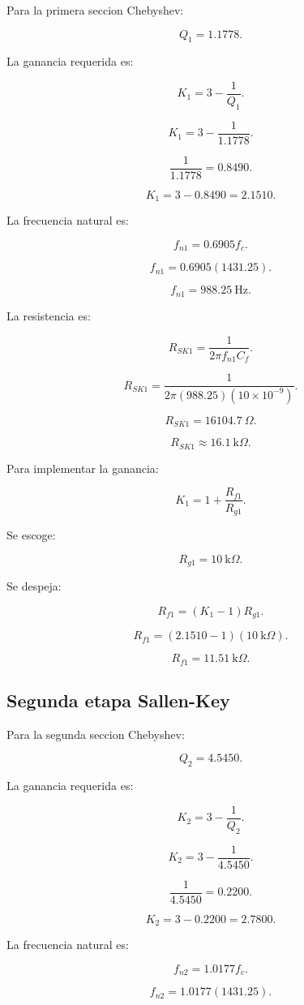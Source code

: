 \documentclass[11pt,letterpaper]{article}
\begin{document}
Para la primera seccion Chebyshev:

\[
Q_1=1.1778.
\]

La ganancia requerida es:

\[
K_1=3-\frac{1}{Q_1}.
\]

\[
K_1=3-\frac{1}{1.1778}.
\]

\[
\frac{1}{1.1778}=0.8490.
\]

\[
K_1=3-0.8490=2.1510.
\]

La frecuencia natural es:

\[
f_{n1}=0.6905f_c.
\]

\[
f_{n1}=0.6905(1431.25).
\]

\[
f_{n1}=988.25~\text{Hz}.
\]

La resistencia es:

\[
R_{SK1}=
\frac{1}{2\pi f_{n1}C_f}.
\]

\[
R_{SK1}=
\frac{1}
{2\pi(988.25)(10\times 10^{-9})}.
\]

\[
R_{SK1}=16104.7~\Omega.
\]

\[
\boxed{R_{SK1}\approx 16.1~\text{k}\Omega}.
\]

Para implementar la ganancia:

\[
K_1=1+\frac{R_{f1}}{R_{g1}}.
\]

Se escoge:

\[
R_{g1}=10~\text{k}\Omega.
\]

Se despeja:

\[
R_{f1}=(K_1-1)R_{g1}.
\]

\[
R_{f1}=(2.1510-1)(10~\text{k}\Omega).
\]

\[
R_{f1}=11.51~\text{k}\Omega.
\]

\subsection{Segunda etapa Sallen-Key}

Para la segunda seccion Chebyshev:

\[
Q_2=4.5450.
\]

La ganancia requerida es:

\[
K_2=3-\frac{1}{Q_2}.
\]

\[
K_2=3-\frac{1}{4.5450}.
\]

\[
\frac{1}{4.5450}=0.2200.
\]

\[
K_2=3-0.2200=2.7800.
\]

La frecuencia natural es:

\[
f_{n2}=1.0177f_c.
\]

\[
f_{n2}=1.0177(1431.25).
\]
\end{document}
